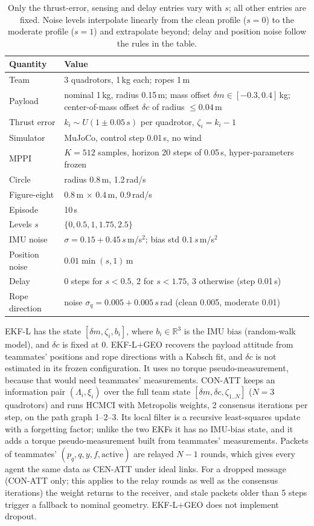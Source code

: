 \documentclass[conference]{IEEEtran}
\begin{document}
\begin{table}[t]
\centering
\caption{Only the thrust-error, sensing and delay entries vary with $s$; all other entries are fixed. Noise levels interpolate linearly from the clean profile ($s{=}0$) to the moderate profile ($s{=}1$) and extrapolate beyond; delay and position noise follow the rules in the table.}
\label{tab:sim}
\footnotesize
\setlength{\tabcolsep}{3pt}
\begin{tabular}{@{}l p{}@{}}
\toprule
Quantity & Value \\
\midrule
Team & 3 quadrotors, 1\,kg each; ropes 1\,m \\
Payload & nominal 1\,kg, radius 0.15\,m; mass offset $\delta m\in[-0.3,0.4]$\,kg; center-of-mass offset $\delta c$ of radius $\le0.04$\,m \\
Thrust error & $k_i\sim U(1\pm0.05\,s)$ per quadrotor, $\zeta_i=k_i-1$ \\
Simulator & MuJoCo, control step 0.01\,s, no wind \\
MPPI & $K{=}512$ samples, horizon 20 steps of 0.05\,s, hyper-parameters frozen \\
Circle & radius 0.8\,m, 1.2\,rad/s \\
Figure-eight & 0.8\,m $\times$ 0.4\,m, 0.9\,rad/s \\
Episode & 10\,s \\
Levels $s$ & $\{0,0.5,1,1.75,2.5\}$ \\
IMU noise & $\sigma=0.15+0.45\,s$\,m/s$^2$; bias std $0.1\,s$\,m/s$^2$ \\
Position noise & $0.01\min(s,1)$\,m \\
Delay & 0 steps for $s<0.5$, 2 for $s<1.75$, 3 otherwise (step 0.01\,s) \\
Rope direction & noise $\sigma_q=0.005+0.005\,s$\,rad (clean 0.005, moderate 0.01) \\
\bottomrule
\end{tabular}
\end{table}

EKF-L has the state $[\delta m,\zeta_i,b_i]$, where $b_i\in\mathbb{R}^3$ is the IMU bias (random-walk model), and $\delta c$ is fixed at 0. EKF-L+GEO recovers the payload attitude from teammates' positions and rope directions with a Kabsch fit, and $\delta c$ is not estimated in its frozen configuration. It uses no torque pseudo-measurement, because that would need teammates' measurements. CON-ATT keeps an information pair $(\Lambda_i,\xi_i)$ over the full team state $[\delta m,\delta c,\zeta_{1..N}]$ ($N{=}3$ quadrotors) and runs HCMCI with Metropolis weights, 2 consensus iterations per step, on the path graph 1--2--3. Its local filter is a recursive least-squares update with a forgetting factor; unlike the two EKFs it has no IMU-bias state, and it adds a torque pseudo-measurement built from teammates' measurements. Packets of teammates' $(p_q,q,y,f,\text{active})$ are relayed $N{-}1$ rounds, which gives every agent the same data as CEN-ATT under ideal links. For a dropped message (CON-ATT only; this applies to the relay rounds as well as the consensus iterations) the weight returns to the receiver, and stale packets older than 5 steps trigger a fallback to nominal geometry. EKF-L+GEO does not implement dropout.
\end{document}
